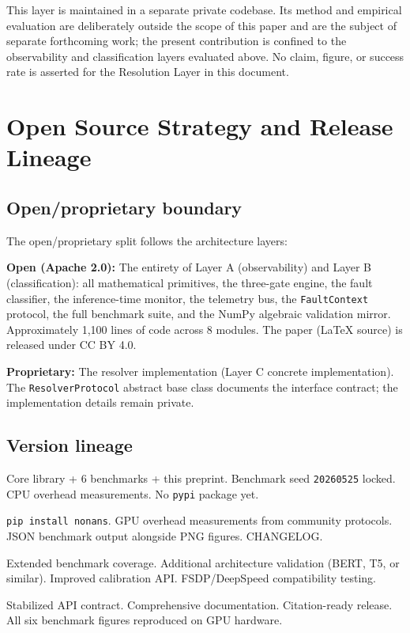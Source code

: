 \documentclass[11pt,a4paper]{article}
\theoremstyle{plain}
\begin{document}
This layer is maintained in a separate private codebase. Its method and
empirical evaluation are deliberately outside the scope of this paper and
are the subject of separate forthcoming work; the present contribution is
confined to the observability and classification layers evaluated above.
No claim, figure, or success rate is asserted for the Resolution Layer in
this document.


\section{Open Source Strategy and Release Lineage}
\label{sec:releases}

\subsection{Open/proprietary boundary}

The open/proprietary split follows the architecture layers:

\textbf{Open (Apache 2.0):}
The entirety of Layer A (observability) and Layer B (classification):
all mathematical primitives, the three-gate engine, the fault classifier,
the inference-time monitor, the telemetry bus, the \texttt{FaultContext}
protocol, the full benchmark suite, and the NumPy algebraic validation
mirror.
Approximately 1,100 lines of code across 8 modules.
The paper (LaTeX source) is released under CC BY 4.0.

\textbf{Proprietary:}
The resolver implementation (Layer C concrete implementation).
The \texttt{ResolverProtocol} abstract base class documents the interface
contract; the implementation details remain private.

\subsection{Version lineage}

\begin{description}[leftmargin=*,itemsep=2pt]
\item[v0.4.0 (current).]
  Core library + 6 benchmarks + this preprint.
  Benchmark seed \texttt{20260525} locked.
  CPU overhead measurements.
  No \texttt{pypi} package yet.

\item[v0.5.0 (planned).]
  \texttt{pip install nonans}.
  GPU overhead measurements from community protocols.
  JSON benchmark output alongside PNG figures.
  CHANGELOG.

\item[v0.6.0 (planned).]
  Extended benchmark coverage.
  Additional architecture validation
  (BERT, T5, or similar).
  Improved calibration API.
  FSDP/DeepSpeed compatibility testing.

\item[v1.0.0 (milestone).]
  Stabilized API contract.
  Comprehensive documentation.
  Citation-ready release.
  All six benchmark figures reproduced on GPU hardware.
\end{description}
\end{document}

